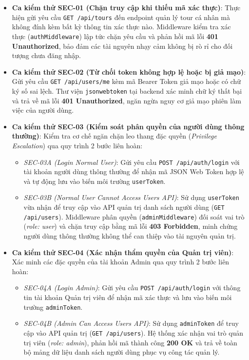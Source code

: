 \begin{itemize}[label=\textbullet]
    \item \textbf{Ca kiểm thử SEC-01 (Chặn truy cập khi thiếu mã xác thực)}: 
    Thực hiện gửi yêu cầu \texttt{GET /api/tours} đến endpoint quản lý tour cá nhân mà không đính kèm bất kỳ thông tin xác thực nào. Middleware kiểm tra xác thực (\texttt{authMiddleware}) lập tức chặn yêu cầu và phản hồi mã lỗi \textbf{401 Unauthorized}, bảo đảm các tài nguyên nhạy cảm không bị rò rỉ cho đối tượng chưa đăng nhập.

    \item \textbf{Ca kiểm thử SEC-02 (Từ chối token không hợp lệ hoặc bị giả mạo)}: 
    Gửi yêu cầu \texttt{GET /api/users/me} kèm mã Bearer Token giả mạo hoặc có chữ ký số sai lệch. Thư viện \texttt{jsonwebtoken} tại backend xác minh chữ ký thất bại và trả về mã lỗi \textbf{401 Unauthorized}, ngăn ngừa nguy cơ giả mạo phiên làm việc của người dùng.

    \item \textbf{Ca kiểm thử SEC-03 (Kiểm soát phân quyền của người dùng thông thường)}: 
    Kiểm tra cơ chế ngăn chặn leo thang đặc quyền (\textit{Privilege Escalation}) qua quy trình 2 bước liên hoàn:
    \begin{itemize}
        \item \textit{SEC-03A (Login Normal User)}: Gửi yêu cầu \texttt{POST /api/auth/login} với tài khoản người dùng thông thường để nhận mã JSON Web Token hợp lệ và tự động lưu vào biến môi trường \texttt{userToken}.
        \item \textit{SEC-03B (Normal User Cannot Access Users API)}: Sử dụng \texttt{userToken} vừa nhận để truy cập vào API quản trị danh sách người dùng (\texttt{GET /api/users}). Middleware phân quyền (\texttt{adminMiddleware}) đối soát vai trò (\textit{role: user}) và chặn truy cập bằng mã lỗi \textbf{403 Forbidden}, minh chứng người dùng thông thường không thể can thiệp vào tài nguyên quản trị.
    \end{itemize}

    \item \textbf{Ca kiểm thử SEC-04 (Xác nhận thẩm quyền của Quản trị viên)}: 
    Xác minh các đặc quyền của tài khoản Admin qua quy trình 2 bước liên hoàn:
    \begin{itemize}
        \item \textit{SEC-04A (Login Admin)}: Gửi yêu cầu \texttt{POST /api/auth/login} với thông tin tài khoản Quản trị viên để nhận mã xác thực và lưu vào biến môi trường \texttt{adminToken}.
        \item \textit{SEC-04B (Admin Can Access Users API)}: Sử dụng \texttt{adminToken} để truy cập vào API quản trị (\texttt{GET /api/users}). Hệ thống xác nhận vai trò quản trị viên (\textit{role: admin}), phản hồi mã thành công \textbf{200 OK} và trả về toàn bộ mảng dữ liệu danh sách người dùng phục vụ công tác quản lý.
    \end{itemize}


\end{itemize}
